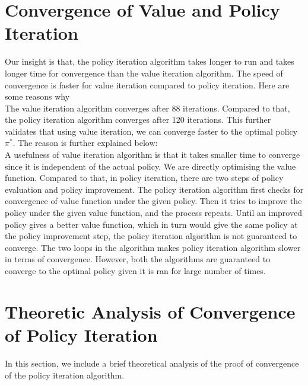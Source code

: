 \documentclass{article}\usepackage[]{graphicx}\usepackage[]{color}
\let\Oldsection\section
\renewcommand{\section}{\FloatBarrier\Oldsection}
\theoremstyle{plain}
\begin{document}
\section{Convergence of Value and Policy Iteration}


\noindent
Our insight is that,  the policy iteration algorithm takes longer to run and takes longer time for convergence than the value iteration algorithm. The speed of convergence is faster for value iteration compared to policy iteration. Here are some reasons why\\


\noindent
The value iteration algorithm converges after 88 iterations. Compared to that, the policy iteration algorithm converges after 120 iterations. This further validates that using value iteration, we can converge faster to the optimal policy $\pi^{*}$. The reason is further explained below:\\

\noindent
A usefulness of value iteration algorithm is that it takes smaller time to converge since it is independent of the actual policy. We are directly optimising the value function. Compared to that, in policy iteration, there are two steps of policy evaluation and policy improvement. The policy iteration algorithm first checks for convergence of value function under the given policy. Then it tries to improve the policy under the given value function, and the process repeats. Until an improved policy gives a better value function, which in turn would give the same policy at the policy improvement step, the policy iteration algorithm is not guaranteed to converge. The two loops in the algorithm makes policy iteration algorithm slower in terms of convergence. However, both the algorithms are guaranteed to converge to the optimal policy given it is ran for large number of times.










\section{Theoretic Analysis of Convergence of Policy Iteration}

\noindent
In this section, we include a brief theoretical analysis of the proof of convergence of the policy iteration algorithm.\\
\end{document}
